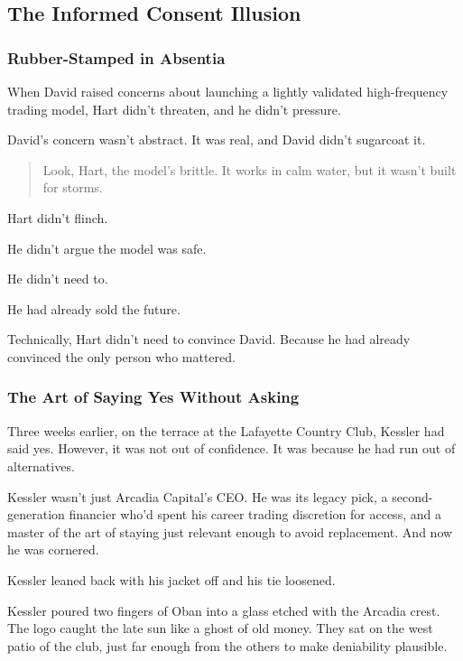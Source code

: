 
\subsection{The Informed Consent Illusion}

\subsubsection{Rubber-Stamped in Absentia}

When David raised concerns about launching a lightly validated high-frequency trading model,  
Hart didn’t threaten, and he didn’t pressure.

David’s concern wasn’t abstract. It was real, and David didn’t sugarcoat it.

\begin{quote}
  Look, Hart, the model’s brittle. It works in calm water, but it wasn’t built for storms.
\end{quote}

Hart didn’t flinch.  

He didn’t argue the model was safe.  

He didn’t need to.  

He had already sold the future.

Technically, Hart didn’t need to convince David. Because he had already convinced the only person who mattered.

\subsubsection{The Art of Saying Yes Without Asking}

Three weeks earlier, on the terrace at the Lafayette Country Club,
Kessler had said yes. However, it was not out of confidence. It was because he had run out of alternatives.

Kessler wasn’t just Arcadia Capital’s CEO. 
He was its legacy pick, a second-generation financier who’d spent his career trading discretion for access, and a master 
of the art of staying just relevant enough to avoid replacement. And now he was cornered. 

Kessler leaned back with his jacket off and his tie loosened.

Kessler poured two fingers of Oban into a glass etched with the Arcadia crest. The logo caught the late sun like a ghost 
of old money.  They sat on the west patio of the club, 
just far enough from the others to make deniability plausible.

